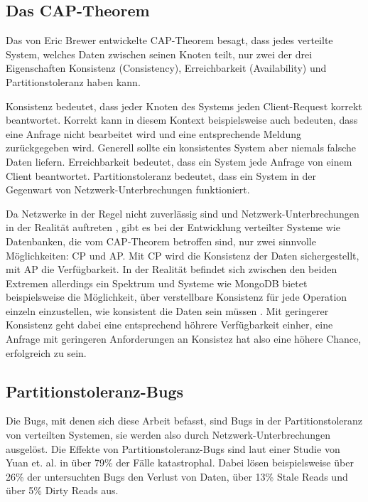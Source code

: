 \documentclass[12pt,a4paper]{report}
\begin{document}
\subsection{Das CAP-Theorem}
Das von Eric Brewer \cite{cap_brewer} entwickelte CAP-Theorem besagt, dass jedes verteilte System, welches Daten zwischen seinen
Knoten teilt, nur zwei der drei Eigenschaften Konsistenz (Consistency), Erreichbarkeit (Availability) und Partitionstoleranz
haben kann.

Konsistenz bedeutet, dass jeder Knoten des Systems jeden Client-Request korrekt beantwortet. Korrekt kann in diesem
Kontext beispielsweise auch bedeuten, dass eine Anfrage nicht bearbeitet wird und eine entsprechende Meldung zurückgegeben wird.
Generell sollte ein konsistentes System aber niemals falsche Daten liefern. Erreichbarkeit bedeutet, dass ein System jede Anfrage
von einem Client beantwortet. Partitionstoleranz bedeutet, dass ein System in der Gegenwart von Netzwerk-Unterbrechungen
funktioniert. \cite{perspectives_on_cap}

Da Netzwerke in der Regel nicht zuverlässig sind und Netzwerk-Unterbrech\-un\-gen in der Realität auftreten \cite{the_network_is_reliable}, gibt es
bei der Entwicklung verteilter Systeme wie Datenbanken, die vom CAP-Theorem betroffen sind, nur zwei sinnvolle Möglichkeiten: CP
und AP. Mit CP wird die Konsistenz der Daten sichergestellt, mit AP die Verfügbarkeit. In der Realität befindet sich zwischen den
beiden Extremen allerdings ein Spektrum und Systeme wie MongoDB bietet beispielsweise die Möglichkeit, über verstellbare Konsistenz für jede
Operation einzeln einzustellen, wie konsistent die Daten sein müssen \cite{tunable_consistency_mongo}. Mit geringerer Konsistenz
geht dabei eine entsprechend höhrere Verfügbarkeit einher, eine Anfrage mit geringeren Anforderungen an Konsistez hat also
eine höhere Chance, erfolgreich zu sein.

\subsection{Partitionstoleranz-Bugs}
Die Bugs, mit denen sich diese Arbeit befasst, sind Bugs in der Partitionstoleranz von verteilten Systemen, sie werden also durch
Netzwerk-Unterbrech\-ungen ausgelöst. Die Effekte von Partitionstoleranz-Bugs sind laut einer Studie von Yuan et. al.
\cite{simple_testing_can_prevent} in über 79\% der Fälle katastrophal. Dabei lösen beispielsweise über 26\% der untersuchten Bugs
den Verlust von Daten, über 13\% Stale Reads und über 5\% Dirty Reads aus.
\end{document}
